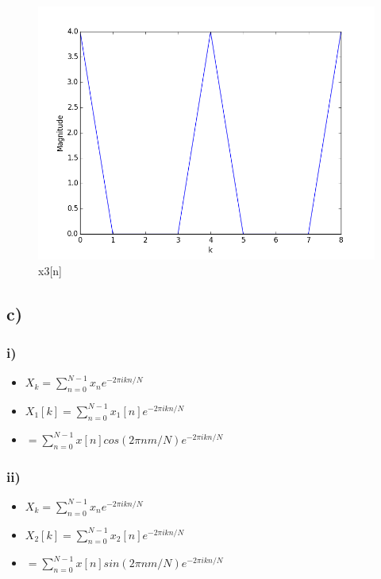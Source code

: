 \begin{figure}[H]
  \centering
  \includegraphics[width=\linewidth]{2b_3}
  \caption{x3[n]}
  \label{fig:2b3}
\end{figure}

\subsection*{c)}
\subsubsection*{i)}
\begin{itemize}[leftmargin=*]
  \item[] \(X_k = \displaystyle\sum_{n = 0}^{N - 1} x_n e^{-2 \pi i k n / N}\)
  \item[] \(X_1[k] = \displaystyle\sum_{n = 0}^{N - 1} x_1[n] e^{-2 \pi i k n / N}\)
  \item[] \(= \displaystyle\sum_{n = 0}^{N - 1} x[n] cos(2 \pi n m / N) e^{-2 \pi i k n / N}\)
\end{itemize}

\subsubsection*{ii)}
\begin{itemize}[leftmargin=*]
  \item[] \(X_k = \displaystyle\sum_{n = 0}^{N - 1} x_n e^{-2 \pi i k n / N}\)
  \item[] \(X_2[k] = \displaystyle\sum_{n = 0}^{N - 1} x_2[n] e^{-2 \pi i k n / N}\)
  \item[] \(= \displaystyle\sum_{n = 0}^{N - 1} x[n] sin(2 \pi n m / N) e^{-2 \pi i k n / N}\)
\end{itemize}

